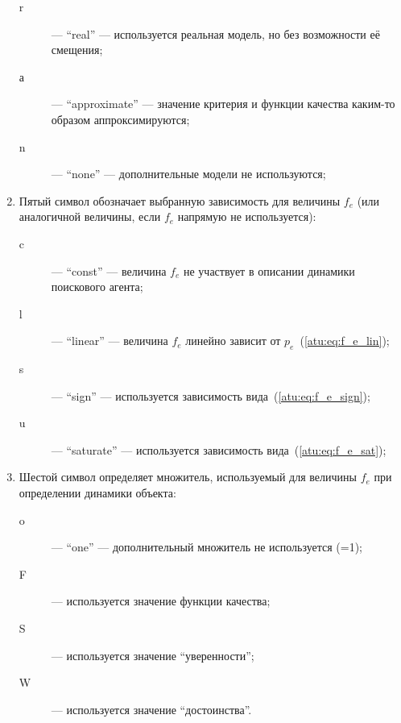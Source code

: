 \begin{enumerate}
\begin{description}
      \item[r] --- ``real'' ---  используется реальная модель, но без возможности её смещения;

      \item[а] --- ``approximate'' --- значение критерия и функции качества каким-то образом аппроксимируются;

      \item[n] --- ``none'' --- дополнительные модели не используются;

    \end{description}

  \item
    Пятый символ обозначает выбранную зависимость для величины $f_e$ (или аналогичной величины, если $f_e$ напрямую не используется):
    \begin{description}

      \item[c]  --- ``const'' --- величина $f_e$ не участвует в описании
        динамики поискового агента;

      \item[l] --- ``linear'' ---  величина $f_e$ линейно зависит
        от $p_e$~(\ref{atu:eq:f_e_lin});

      \item[s] --- ``sign'' --- используется зависимость вида~(\ref{atu:eq:f_e_sign});

      \item[u] --- ``saturate'' ---  используется зависимость вида~(\ref{atu:eq:f_e_sat});

    \end{description}

  \item
    Шестой символ определяет множитель, используемый для величины $f_e$ при определении динамики объекта:
    \begin{description}

      \item[o]  --- ``one'' --- дополнительный множитель не используется (=1);

      \item[F] ---  используется значение функции качества;

      \item[S] --- используется значение ``уверенности'';

      \item[W] --- используется значение ``достоинства''.

    \end{description}


\end{enumerate}

